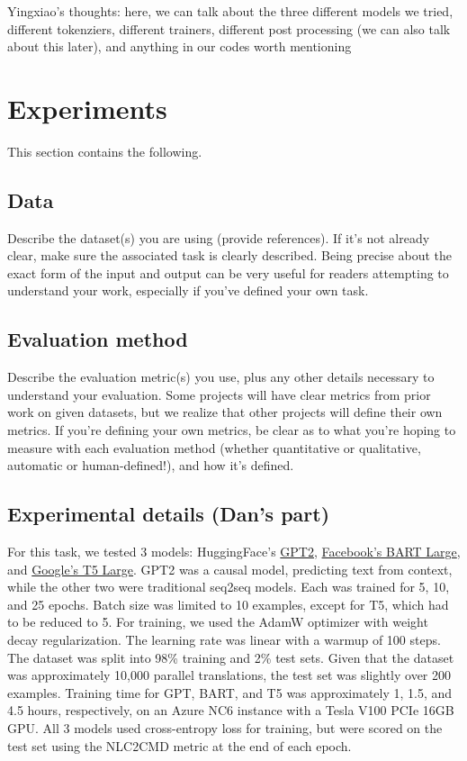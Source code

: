 \documentclass{article}
\begin{document}
Yingxiao's thoughts: here, we can talk about the three different models we tried, different tokenziers, different trainers, different post processing (we can also talk about this later), and anything in our codes worth mentioning

\section{Experiments}
This section contains the following.

\subsection{Data}
Describe the dataset(s) you are using (provide references). If it's not already clear, make sure the associated task is clearly described.
Being precise about the exact form of the input and output can be very useful for readers attempting to understand your work, especially if you've defined your own task.

\subsection{Evaluation method}
Describe the evaluation metric(s) you use, plus any other details necessary to understand your evaluation.
Some projects will have clear metrics from prior work on given datasets, but we realize that other projects will define their own metrics.
If you're defining your own metrics, be clear as to what you're hoping to measure with each evaluation method (whether quantitative or qualitative, automatic or human-defined!), and how it's defined.

\color{red}
\subsection{Experimental details (Dan's part)}
\color{black}
For this task, we tested 3 models: HuggingFace's
\href{https://huggingface.co/gpt2}{GPT2}\cite{gpt2},
\href{https://huggingface.co/facebook/bart-large}{Facebook's BART
Large}\cite{bart}, and \href{https://huggingface.co/t5-large}{Google's T5
Large}. GPT2 was a causal model, predicting text from context, while the other
two were traditional seq2seq models. Each was trained for 5, 10, and 25 epochs.
Batch size was limited to 10 examples, except for T5, which had to be reduced
to 5. For training, we used the AdamW optimizer with weight decay
regularization. The learning rate was linear with a warmup of 100 steps. The
dataset was split into 98\% training and 2\% test sets. Given that the dataset
was approximately 10,000 parallel translations, the test set was slightly over
200 examples. Training time for GPT, BART, and T5 was approximately 1, 1.5, and 4.5
hours, respectively, on an Azure NC6 instance with a Tesla V100 PCIe
16GB GPU. All 3 models used cross-entropy loss for training, but were scored on
the test set using the NLC2CMD metric at the end of each epoch.
\end{document}
